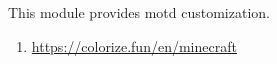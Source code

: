 This module provides motd customization.

\begin{enumerate}
    \item \url{https://colorize.fun/en/minecraft}
\end{enumerate}
